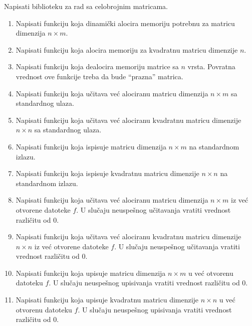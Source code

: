 \begin{Exercise}[label=2_19]
Napisati biblioteku za rad sa celobrojnim matricama. 
\begin{enumerate}
\item Napisati funkciju 
  koja dinamički alocira memoriju potrebnu za matricu dimenzija $n
  \times m$.
\item Napisati funkciju  koja alocira memoriju za kvadratnu matricu dimenzije $n$.
\item Napisati funkciju  koja dealocira memoriju matrice sa $n$ vrsta. Povratna vrednost
  ove funkcije treba da bude ``prazna'' matrica.
\item Napisati funkciju  koja učitava već alociranu matricu dimenzija $n \times m$ sa
  standardnog ulaza.
\item Napisati funkciju  koja učitava već alociranu kvadratnu matricu dimenzije
  $n \times n$ sa standardnog ulaza.
\item Napisati funkciju  koja ispisuje matricu dimenzija $n \times m$ na standardnom
  izlazu.
\item Napisati funkciju  koja ispisuje kvadratnu matricu dimenzije $n \times n$ na
  standardnom izlazu.
\item Napisati funkciju  koja učitava već alociranu matricu
  dimenzija $n \times m$ iz već otvorene datoteke $f$. U slučaju
  neuspešnog učitavanja vratiti vrednost različitu od $0$.
\item Napisati funkciju 
  koja učitava već alociranu kvadratnu matricu dimenzije $n \times n$ iz već
  otvorene datoteke $f$.  U slučaju neuspešnog učitavanja vratiti
  vrednost različitu od $0$.
\item Napisati funkciju  koja upisuje matricu dimenzija $n
  \times m$ u već otvorenu datoteku $f$. U slučaju neuspešnog
  upisivanja vratiti vrednost različitu od $0$.
\item Napisati funkciju 
  koja upisuje kvadratnu matricu dimenzije $n \times n$ u već otvorenu datoteku
  $f$. U slučaju neuspešnog upisivanja vratiti vrednost različitu od
  $0$.
\end{enumerate}


\end{Exercise}
